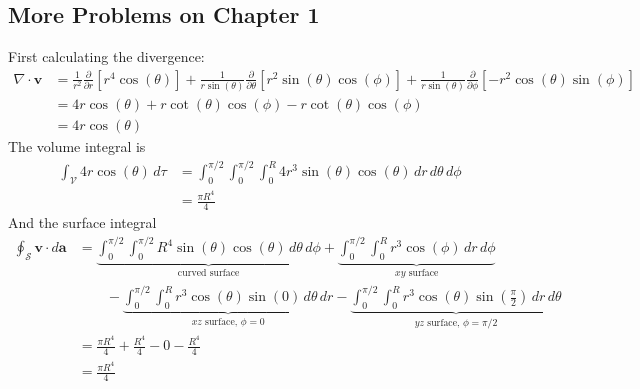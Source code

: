 \documentclass[a4paper]{article}
\begin{document}
\newpage
\subsection{\textsf{More Problems on Chapter 1}}

First calculating the divergence:
\begin{align*}
	\nabla \cdot \pmb{v} & = \frac{1}{r^{2}}\frac{\partial }{\partial r}\!\left[ r^{4}\cos\!\left(\theta\right) \right] + \frac{1}{r \sin\!\left(\theta\right)}\frac{\partial }{\partial \theta}\!\left[ r^{2}\sin\!\left(\theta\right)\cos\!\left(\phi\right) \right] + \frac{1}{r \sin\!\left(\theta\right)}\frac{\partial }{\partial \phi}\!\left[ -r^{2}\cos\!\left(\theta\right)\sin\!\left(\phi\right) \right] \\
			     & = 4r \cos\!\left(\theta\right) + r \cot\!\left(\theta\right)\cos\!\left(\phi\right) - r \cot\!\left(\theta\right)\cos\!\left(\phi\right) \\
			     & = 4r \cos\!\left(\theta\right)
\end{align*}
The volume integral is
\begin{align*}
	\int_{\mathcal{V}}4r \cos\!\left(\theta\right) \, d \tau & = \int^{\pi / 2}_{0} \int^{\pi / 2}_{0} \int^{R}_{0} 4r^{3}\sin\!\left(\theta\right)\cos\!\left(\theta\right) \, dr \, d \theta \, d \phi \\
								 & = \frac{\pi R^{4}}{4}
\end{align*}
And the surface integral
\begin{align*}
	\oint_{\mathcal{S}}\pmb{v} \cdot d \pmb{a} & = \underbrace{\int^{\pi / 2}_{0} \int^{\pi / 2}_{0} R^{4}\sin\!\left(\theta\right)\cos\!\left(\theta\right) \, d \theta \, d \phi}_{\text{curved surface}} + \underbrace{\int^{\pi / 2}_{0} \int^{R}_{0} r^{3}\cos\!\left(\phi\right) \, dr \, d \phi}_{xy \text{ surface}} \\
	& \qquad -\underbrace{\int^{\pi / 2}_{0} \int^{R}_{0} r^{3}\cos\!\left(\theta\right)\sin\!\left(0\right) \, d \theta \, dr}_{xz \text{ surface, } \phi = 0} -\underbrace{\int^{\pi / 2}_{0} \int^{R}_{0} r^{3}\cos\!\left(\theta\right)\sin\!\left(\frac{\pi}{2}\right) \, dr \, d \theta}_{yz \text{ surface, } \phi = \pi / 2} \\
	& = \frac{\pi R^{4}}{4} + \frac{R^{4}}{4} - 0 - \frac{R^{4}}{4} \\
	& = \frac{\pi R^{4}}{4}
\end{align*}
\end{document}
